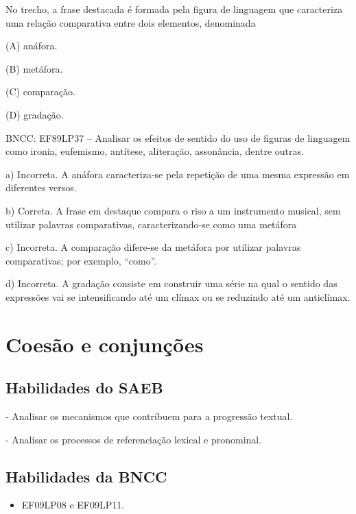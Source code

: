 \begin{itemize}
\begin{itemize}
{\begin{itemize}
\begin{itemize}
No trecho, a frase destacada é formada pela figura de linguagem que
caracteriza uma relação comparativa entre dois elementos, denominada

(A) anáfora.

(B) metáfora.

(C) comparação.

(D) gradação.

BNCC: EF89LP37 -- Analisar os efeitos de sentido do uso de figuras de
linguagem como ironia, eufemismo, antítese, aliteração, assonância,
dentre outras.

a) Incorreta. A anáfora caracteriza-se pela repetição de uma mesma
expressão em diferentes versos.

b) Correta. A frase em destaque compara o riso a um instrumento musical,
sem utilizar palavras comparativas, caracterizando-se como uma metáfora

c) Incorreta. A comparação difere-se da metáfora por utilizar palavras
comparativas; por exemplo, ``como''.

d) Incorreta. A gradação consiste em construir uma série na qual o
sentido das expressões vai se intensificando até um clímax ou se
reduzindo até um anticlímax.

\chapter{Coesão e conjunções}

\section{Habilidades do SAEB}

- Analisar os mecanismos que contribuem para a progressão textual.

- Analisar os processos de referenciação lexical e pronominal.

\section{Habilidades da BNCC}

\begin{itemize}
\item EF09LP08 e EF09LP11.
\end{itemize}

\end{itemize}
\end{itemize}}
\end{itemize}
\end{itemize}
